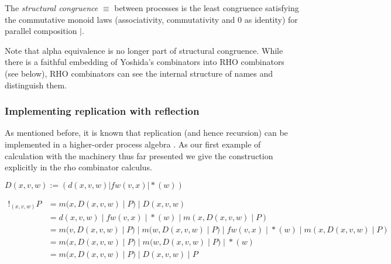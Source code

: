 \documentclass{llncs}
\newcommand{\pzero}{\mathbin{0}}
\begin{document}
\begin{definition}
  The {\em structural congruence} $\equiv$
  between processes \cite{SangiorgiWalker} is the least congruence
  satisfying the commutative monoid laws
  (associativity, commutativity and $\pzero$ as identity) for parallel
  composition $|$.
\end{definition}

Note that alpha equivalence is no longer part of structural congruence.  While there is a faithful embedding of Yoshida's combinators into RHO combinators (see below), RHO combinators can see the internal structure of names and distinguish them.

\subsubsection{Implementing replication with reflection}

% 
% 
% 
% 
% 
As mentioned before, it is known that replication (and hence
recursion) can be implemented in a higher-order process algebra
\cite{SangiorgiWalker}. As our first example of calculation with the
machinery thus far presented we give the construction explicitly in
the rho combinator calculus.

\begin{definition}[Replication]
  $D(x,v,w) := (d(x,v,w) | fw(v,x) | {*}(w))$
\end{definition}
\[\begin{array}{rl}
  !_{(x,v,w)} P &= m(x,D(x,v,w) \; |\; P) \; |\; D(x,v,w) \\
        &= d(x,v,w) \; |\; fw(v,x) \; |\; {*}(w) \; |\; m(x,D(x,v,w) \; |\; P) \\
        &= m(v,D(x,v,w) \; |\; P) \; |\; m(w,D(x,v,w) \; |\; P) \; |\; fw(v,x) \; |\; {*}(w) \; |\; m(x,D(x,v,w) \; |\; P) \\
        &= m(x,D(x,v,w) \; |\; P) \; |\; m(w,D(x,v,w) \; |\; P) \; |\; {*}(w) \\
        &= m(x,D(x,v,w) \; |\; P) \; |\; D(x,v,w) \; |\; P
\end{array}\]
\end{document}
